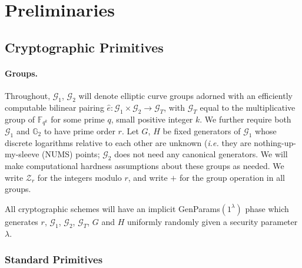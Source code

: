 \documentclass[letterpaper]{article}
\newcommand{\e}{\hat{e}}
\begin{document}
\section{Preliminaries}

\subsection{Cryptographic Primitives}

\paragraph{Groups.} Throughout, $\mathcal{G}_1$, $\mathcal{G}_2$ will denote
elliptic curve groups adorned with an efficiently computable bilinear pairing
$\e:\mathcal{G}_1\times\mathcal{G}_2\to\mathcal{G}_T$, with $\mathcal{G}_T$
equal to the multiplicative group of $\mathbb{F}_{q^k}$ for some prime $q$,
small positive integer $k$. We further require both $\mathcal{G}_1$ and
$\mathbb{G}_2$ to have prime order $r$. Let $G$, $H$ be fixed generators of
$\mathcal{G}_1$ whose discrete logarithms relative to each other are unknown
(\emph{i.e.} they are nothing-up-my-sleeve (NUMS) points; $\mathcal{G}_2$
does not need any canonical generators. We will make computational hardness
assumptions about these groups as needed. We write $\mathcal{Z}_r$
for the integers modulo $r$, and write $+$ for the group operation in all
groups.

All cryptographic schemes will have an implicit \textrm{GenParams}$(1^\lambda)$
phase which generates $r$, $\mathcal{G}_1$, $\mathcal{G}_2$, $\mathcal{G}_T$,
$G$ and $H$ uniformly randomly given a security parameter $\lambda$.

\subsubsection{Standard Primitives}
\end{document}
